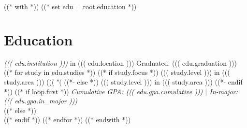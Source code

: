 ((* with *))
((* set edu = root.education *))
\section{Education}\relax
    {\large\emph{((( edu.institution )))}} {\small in ((( edu.location )))} \hfill Graduated: ((( edu.graduation )))\\
((* for study in edu.studies *))
        ((* if study.focus *))
    ((( study.level ))) in ((( study.area ))) ((( "(%
        ((*- else *))
    ((( study.level ))) in ((( study.area )))
        ((*- endif *))
        ((* if loop.first *))
 \hfill \emph{Cumulative GPA: ((( edu.gpa.cumulative ))) $|$ In-major: ((( edu.gpa.in_major )))}\\
        ((* else *))
\\
        ((* endif *))
((* endfor *))
((* endwith *))
